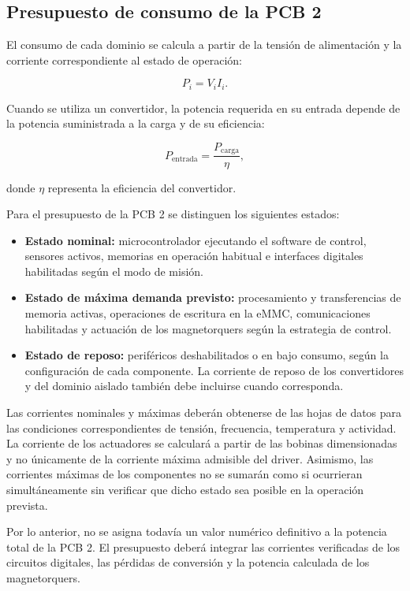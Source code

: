 \documentclass[11pt,a4paper]{article}
\begin{document}
\subsection{Presupuesto de consumo de la PCB 2}

El consumo de cada dominio se calcula a partir de la tensión de
alimentación y la corriente correspondiente al estado de operación:

\[
P_i=V_iI_i.
\]

Cuando se utiliza un convertidor, la potencia requerida en su
entrada depende de la potencia suministrada a la carga y de su
eficiencia:

\[
P_{\mathrm{entrada}}=\frac{P_{\mathrm{carga}}}{\eta},
\]

donde \(\eta\) representa la eficiencia del convertidor.

Para el presupuesto de la PCB 2 se distinguen los siguientes estados:

\begin{itemize}
    \item \textbf{Estado nominal:} microcontrolador ejecutando el
    software de control, sensores activos, memorias en operación
    habitual e interfaces digitales habilitadas según el modo de
    misión.

    \item \textbf{Estado de máxima demanda previsto:} procesamiento
    y transferencias de memoria activas, operaciones de escritura
    en la eMMC, comunicaciones habilitadas y actuación de los
    magnetorquers según la estrategia de control.

    \item \textbf{Estado de reposo:} periféricos deshabilitados o
    en bajo consumo, según la configuración de cada componente.
    La corriente de reposo de los convertidores y del dominio
    aislado también debe incluirse cuando corresponda.
\end{itemize}

Las corrientes nominales y máximas deberán obtenerse de las hojas
de datos para las condiciones correspondientes de tensión,
frecuencia, temperatura y actividad. La corriente de los actuadores
se calculará a partir de las bobinas dimensionadas y no únicamente
de la corriente máxima admisible del driver. Asimismo, las
corrientes máximas de los componentes no se sumarán como si
ocurrieran simultáneamente sin verificar que dicho estado sea
posible en la operación prevista.

Por lo anterior, no se asigna todavía un valor numérico definitivo
a la potencia total de la PCB 2. El presupuesto deberá integrar
las corrientes verificadas de los circuitos digitales, las pérdidas
de conversión y la potencia calculada de los magnetorquers.
\end{document}
